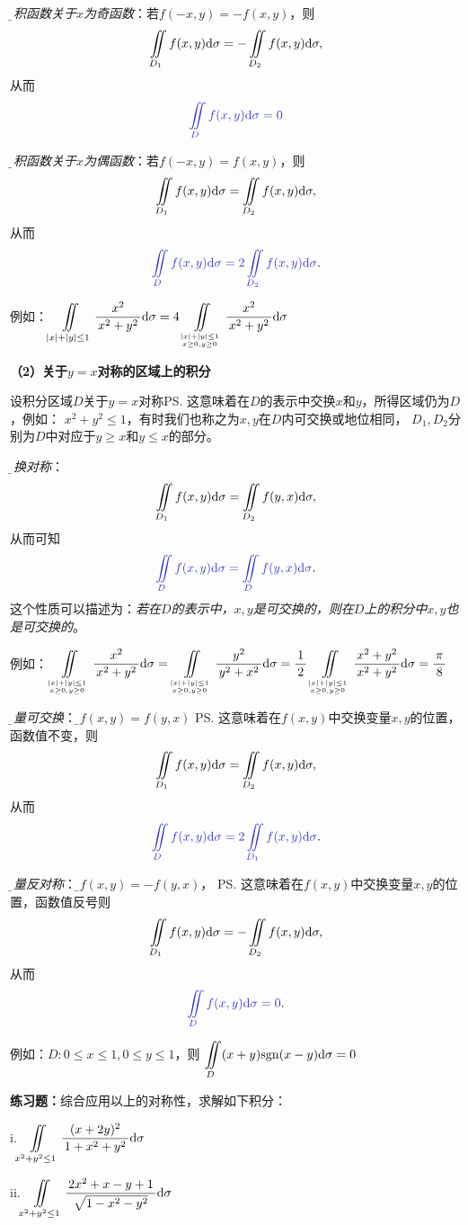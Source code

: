 {\it\b 被积函数关于$x$为奇函数}：若$f(-x,y)=-f(x,y)$，则
$$\displaystyle\iint\limits_{D_1}f(x,y)\mathrm{d}\sigma=-\displaystyle\iint\limits_{D_2}f(x,y)\mathrm{d}\sigma,$$
从而
$${\b \ds\iint\limits_{D}f(x,y)\d\sigma=0}$$

{\it\b 被积函数关于$x$为偶函数}：若$f(-x,y)=f(x,y)$，则
$$\displaystyle\iint\limits_{D_1}f(x,y)\mathrm{d}\sigma=\displaystyle\iint\limits_{D_2}f(x,y)\mathrm{d}\sigma,$$
从而
$${\b\ds\iint\limits_{D}f(x,y)\d\sigma=2\ds\iint\limits_{D_2}f(x,y)\d\sigma}.$$

例如：$\displaystyle\iint\limits_{|x|+|y|\leq1}\displaystyle\frac{\,{x^2}\,}{\,{x^2+y^2}\,}\mathrm{d}\sigma
=4\displaystyle\iint\limits_{|x|+|y|\leq1\atop{x\geq0,y\geq0}}\displaystyle\frac{\,{x^2}\,}{\,{x^2+y^2}\,}
\mathrm{d}\sigma$

{\bf（2）关于$y=x$对称的区域上的积分}

设积分区域$D$关于$y=x$对称\ps{这意味着在$D$的表示中交换$x$和$y$，所得区域仍为$D$，例如：
$x^2+y^2\leq 1$，有时我们也称之为$x,y$在$D$内可交换或地位相同}，
$D_1,D_2$分别为$D$中对应于$y\geq x$和$y\leq x$的部分。

{\it\b 轮换对称}：
$$\displaystyle\iint\limits_{D_1}f(x,y)\mathrm{d}\sigma=\displaystyle\iint\limits_{D_2}f(y,x)\mathrm{d}\sigma,$$
从而可知
$${\b\ds\iint\limits_{D}f(x,y)\d\sigma=\ds\iint\limits_{D}f(y,x)\d\sigma}.$$
这个性质可以描述为：{\it 若在$D$的表示中，$x,y$是可交换的，则在$D$上的积分中$x,y$也是可交换的}。

例如：$\displaystyle\iint\limits_{|x|+|y|\leq1\atop{x\geq0,y\geq0}}\displaystyle\frac{\,{x^2}\,}{\,{x^2+y^2}\,}\mathrm{d}\sigma
=\displaystyle\iint\limits_{|x|+|y|\leq1\atop{x\geq0,y\geq0}}\displaystyle\frac{\,{y^2}\,}{\,{y^2+x^2}\,}\mathrm{d}\sigma
=\displaystyle\frac{\,{1}\,}{\,{2}\,}\displaystyle\iint\limits_{|x|+|y|\leq1\atop{x\geq0,y\geq0}}\displaystyle\frac{\,{x^2+y^2}\,}{\,{x^2+y^2}\,}\mathrm{d}\sigma
=\displaystyle\frac{\,{\pi}\,}{\,{8}\,}
$

{\it\b 变量可交换}：若{\b$f(x,y)=f(y,x)$}
\ps{这意味着在$f(x,y)$中交换变量$x,y$的位置，函数值不变}，则
$$\displaystyle\iint\limits_{D_1}f(x,y)\mathrm{d}\sigma=\displaystyle\iint\limits_{D_2}f(x,y)\mathrm{d}\sigma,$$
从而
$${\b\ds\iint\limits_Df(x,y)\d\sigma=2\ds\iint\limits_{D_1}f(x,y)\d\sigma}.$$

{\it\b 变量反对称}：若{\b $f(x,y)=-f(y,x)$}，
\ps{这意味着在$f(x,y)$中交换变量$x,y$的位置，函数值反号}则
$$\displaystyle\iint\limits_{D_1}f(x,y)\mathrm{d}\sigma=-\displaystyle\iint\limits_{D_2}f(x,y)\mathrm{d}\sigma,$$
从而
$${\b\ds\iint\limits_{D}f(x,y)\d\sigma=0}.$$

例如：$D:0\leq x\leq 1,0\leq y\leq 1$，则
$\displaystyle\iint\limits_D(x+y)\mathrm{sgn}(x-y)\mathrm{d}\sigma=0$

{\bf 练习题：}综合应用以上的对称性，求解如下积分：

i.\;$\displaystyle\iint\limits_{x^2+y^2\leq 1}\displaystyle\frac{\,{(x+2y)^2}\,}{\,{1+x^2+y^2}\,}\mathrm{d}\sigma$

ii.\;$\displaystyle\iint\limits_{x^2+y^2\leq 1}\displaystyle\frac{\,{2x^2+x-y+1}\,}{\,{\sqrt{1-x^2-y^2}}\,}\mathrm{d}\sigma$

